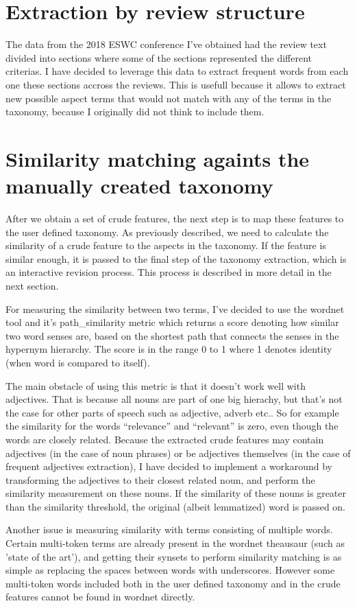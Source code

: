 \section{Extraction by review structure}
The data from the 2018 ESWC conference I've obtained had the review text divided into sections where some of the sections represented the different criterias. I have decided to leverage this data to extract frequent words from each one these sections accross the reviews. This is usefull because it allows to extract new possible aspect terms that would not match with any of the terms in the taxonomy, because I originally did not think to  include them.
\section{Similarity matching againts the manually created taxonomy}
After we obtain a set of crude features, the next step is to map these features to the user defined taxonomy. As previously described, we need to calculate the similarity of a crude feature to the aspects in the taxonomy. If the feature is similar enough, it is passed to the final step of the taxonomy extraction, which is an interactive revision process. This process is described in more detail in the next section.

For measuring the similarity between two terms, I've decided to use the wordnet tool and it's path\_similarity metric which returns a score denoting how similar two word senses are, based on the shortest path that connects the senses in the hypernym hierarchy. The score is in the range 0 to 1 where 1 denotes identity (when word is compared to itself). \cite{nltk_ps}

The main obstacle of using this metric is that it doesn't work well with adjectives. That is because all nouns are part of one big hierachy, but that's not the case for other parts of speech such as adjective, adverb etc.. So for example the similarity for the words ``relevance'' and ``relevant'' is zero, even though the words are closely related. Because the extracted crude features may contain adjectives (in the case of noun phrases) or be adjectives themselves (in the case of frequent adjectives extraction), I have decided to implement a workaround by transforming the adjectives to their closest related noun, and perform the similarity measurement on these nouns. If the similarity of these nouns is greater than the similarity threshold, the original (albeit lemmatized) word is passed on. 

Another issue is measuring similarity with terms consisting of multiple words. Certain multi-token terms are already present in the wordnet theausaur (such as 'state of the art'), and getting their synsets to perform similarity matching is as simple as replacing the spaces between words with underscores. However some multi-token words included both in the user defined taxonomy and in the crude features cannot be found in wordnet directly.

